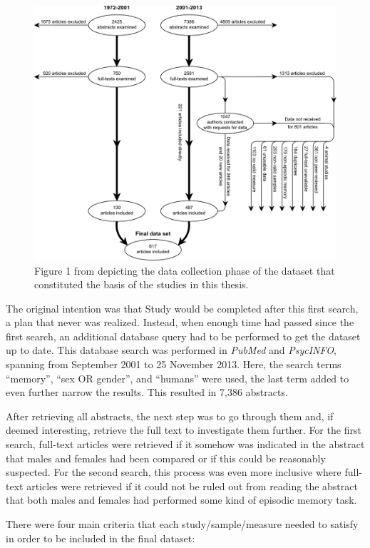 \begin{figure} \centering \includegraphics[width=120mm]{./Figures/Flow_chart.pdf} \caption{Figure 1 from \textcite{Asperholm2019} depicting the data collection phase of the dataset that constituted the basis of the studies in this thesis.} \label{Figure:Flow_chart} \end{figure}

The original intention was that Study  would be completed after this first search, a plan that never was realized. Instead, when enough time had passed since the first search, an additional database query had to be performed to get the dataset up to date. This database search was performed in \emph{PubMed} and \emph{PsycINFO}, spanning from September 2001 to 25 November 2013. Here, the search terms ``memory'', ``sex OR gender'', and ``humans'' were used, the last term added to even further narrow the results. This resulted in 7,386 abstracts.

After retrieving all abstracts, the next step was to go through them and, if deemed interesting, retrieve the full text to investigate them further. For the first search, full-text articles were retrieved if it somehow was indicated in the abstract that males and females had been compared or if this could be reasonably suspected. For the second search, this process was even more inclusive where full-text articles were retrieved if it could not be ruled out from reading the abstract that both males and females had performed some kind of episodic memory task.

There were four main criteria that each study/sample/measure needed to satisfy in order to be included in the final dataset:

